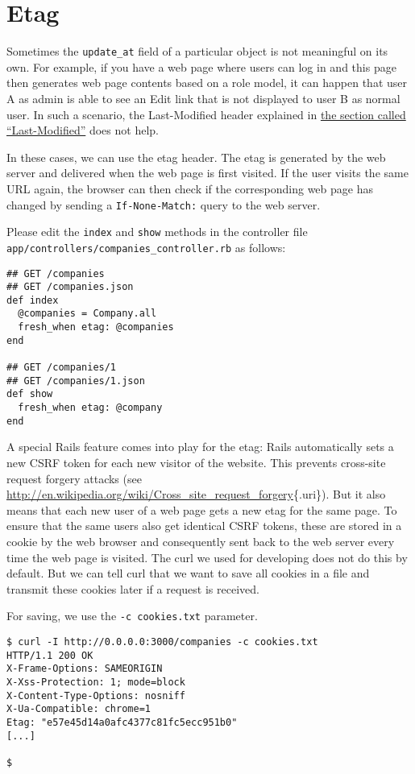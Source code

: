 \documentclass[a4paper]{book}
\newcommand{\chap}[1]{\newpage\thispagestyle{empty}\chapter{#1}\label{chap:\thechapter}}
\begin{document}
\chap{Etag}\label{etag}

Sometimes the \texttt{update\_at} field of a particular object is not meaningful on its own. For example, if you have a web page where users can log in and this page then generates web page contents based on a role model, it can happen that user A as admin is able to see an Edit link that is not displayed to user B as normal user. In such a scenario, the Last-Modified header explained in \hyperref[httpux5fcachingux5flastux5fmodified]{the section called “Last-Modified”} does not help.

In these cases, we can use the etag header. The etag is generated by the web server and delivered when the web page is first visited. If the user visits the same URL again, the browser can then check if the corresponding web page has changed by sending a \texttt{If-None-Match:} query to the web server.

Please edit the \texttt{index} and \texttt{show} methods in the controller file \texttt{app/controllers/companies\_controller.rb} as follows:

\begin{shaded}\begin{verbatim}
## GET /companies
## GET /companies.json
def index
  @companies = Company.all
  fresh_when etag: @companies
end

## GET /companies/1
## GET /companies/1.json
def show
  fresh_when etag: @company
end
\end{verbatim}\end{shaded}

A special Rails feature comes into play for the etag: Rails automatically sets a new CSRF token for each new visitor of the website. This prevents cross-site request forgery attacks (see \url{http://en.wikipedia.org/wiki/Cross_site_request_forgery}\{.uri\}). But it also means that each new user of a web page gets a new etag for the same page. To ensure that the same users also get identical CSRF tokens, these are stored in a cookie by the web browser and consequently sent back to the web server every time the web page is visited. The curl we used for developing does not do this by default. But we can tell curl that we want to save all cookies in a file and transmit these cookies later if a request is received.

For saving, we use the \texttt{-c cookies.txt} parameter.

\begin{shaded}\begin{verbatim}
$ curl -I http://0.0.0.0:3000/companies -c cookies.txt
HTTP/1.1 200 OK
X-Frame-Options: SAMEORIGIN
X-Xss-Protection: 1; mode=block
X-Content-Type-Options: nosniff
X-Ua-Compatible: chrome=1
Etag: "e57e45d14a0afc4377c81fc5ecc951b0"
[...]

$
\end{verbatim}\end{shaded}
\end{document}
